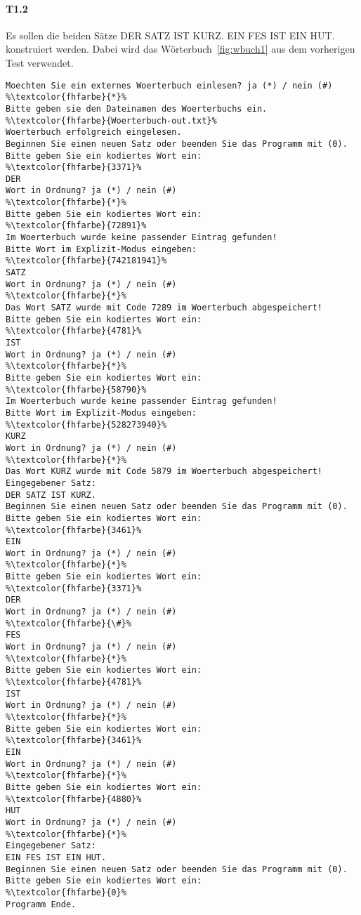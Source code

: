 \paragraph*{T1.2} Es sollen die beiden Sätze \glqq DER SATZ IST KURZ. EIN FES IST EIN HUT.\grqq{} konstruiert werden.
Dabei wird das Wörterbuch~\ref{fig:wbuch1} aus dem vorherigen Test verwendet.
\begin{lstlisting}[escapechar=\%]
Moechten Sie ein externes Woerterbuch einlesen? ja (*) / nein (#)
%\textcolor{fhfarbe}{*}%
Bitte geben sie den Dateinamen des Woerterbuchs ein.
%\textcolor{fhfarbe}{Woerterbuch-out.txt}%
Woerterbuch erfolgreich eingelesen.
Beginnen Sie einen neuen Satz oder beenden Sie das Programm mit (0).
Bitte geben Sie ein kodiertes Wort ein:
%\textcolor{fhfarbe}{3371}%
DER
Wort in Ordnung? ja (*) / nein (#)
%\textcolor{fhfarbe}{*}%
Bitte geben Sie ein kodiertes Wort ein:
%\textcolor{fhfarbe}{72891}%
Im Woerterbuch wurde keine passender Eintrag gefunden!
Bitte Wort im Explizit-Modus eingeben:
%\textcolor{fhfarbe}{742181941}%
SATZ
Wort in Ordnung? ja (*) / nein (#)
%\textcolor{fhfarbe}{*}%
Das Wort SATZ wurde mit Code 7289 im Woerterbuch abgespeichert!
Bitte geben Sie ein kodiertes Wort ein:
%\textcolor{fhfarbe}{4781}%
IST
Wort in Ordnung? ja (*) / nein (#)
%\textcolor{fhfarbe}{*}%
Bitte geben Sie ein kodiertes Wort ein:
%\textcolor{fhfarbe}{58790}%
Im Woerterbuch wurde keine passender Eintrag gefunden!
Bitte Wort im Explizit-Modus eingeben:
%\textcolor{fhfarbe}{528273940}%
KURZ
Wort in Ordnung? ja (*) / nein (#)
%\textcolor{fhfarbe}{*}%
Das Wort KURZ wurde mit Code 5879 im Woerterbuch abgespeichert!
Eingegebener Satz:
DER SATZ IST KURZ.
Beginnen Sie einen neuen Satz oder beenden Sie das Programm mit (0).
Bitte geben Sie ein kodiertes Wort ein:
%\textcolor{fhfarbe}{3461}%
EIN
Wort in Ordnung? ja (*) / nein (#)
%\textcolor{fhfarbe}{*}%
Bitte geben Sie ein kodiertes Wort ein:
%\textcolor{fhfarbe}{3371}%
DER
Wort in Ordnung? ja (*) / nein (#)
%\textcolor{fhfarbe}{\#}%
FES
Wort in Ordnung? ja (*) / nein (#)
%\textcolor{fhfarbe}{*}%
Bitte geben Sie ein kodiertes Wort ein:
%\textcolor{fhfarbe}{4781}%
IST
Wort in Ordnung? ja (*) / nein (#)
%\textcolor{fhfarbe}{*}%
Bitte geben Sie ein kodiertes Wort ein:
%\textcolor{fhfarbe}{3461}%
EIN
Wort in Ordnung? ja (*) / nein (#)
%\textcolor{fhfarbe}{*}%
Bitte geben Sie ein kodiertes Wort ein:
%\textcolor{fhfarbe}{4880}%
HUT
Wort in Ordnung? ja (*) / nein (#)
%\textcolor{fhfarbe}{*}%
Eingegebener Satz:
EIN FES IST EIN HUT.
Beginnen Sie einen neuen Satz oder beenden Sie das Programm mit (0).
Bitte geben Sie ein kodiertes Wort ein:
%\textcolor{fhfarbe}{0}%
Programm Ende.
\end{lstlisting}
